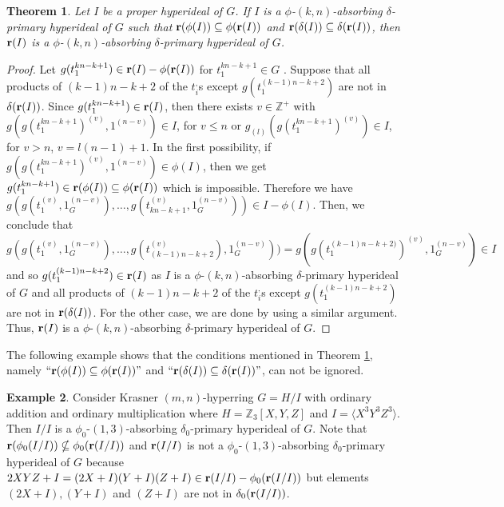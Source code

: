 \documentclass[preprint,review,10pt]{amsart}
\newtheorem{theorem}{Theorem}[section]
\theoremstyle{definition}
\newtheorem{example}[theorem]{Example}
\theoremstyle{remark}
\numberwithin{equation}{section}
\begin{document}
\begin{theorem} \label{1}
Let $I$ be a proper hyperideal of $G$. If $I$ is a $\phi$-$(k,n)$-absorbing $\delta$-primary hyperideal of $G$ such that  ${\bf r}(\phi(I)) \subseteq \phi({\bf r}(I))$ and  ${\bf r}(\delta(I)) \subseteq \delta({\bf r}(I))$, then ${\bf r}(I)$ is a $\phi$-$(k,n)$-absorbing $\delta$-primary hyperideal of $G$.
\end{theorem}
\begin{proof}
Let  $g(t_1^{kn-k+1}) \in {\bf r}(I)-\phi({\bf r}(I))$ for $t_1^{kn-k+1} \in G$ . Suppose that  all products of $(k-1)n-k+2$ of the $t_i^,$s except $g(t_1^{(k-1)n-k+2})$ are not in $\delta({\bf r}(I))$. Since $g(t_1^{kn-k+1}) \in {\bf r}(I)$, then there exists $v \in \mathbb{Z}^+$ with $g(g(t_1^{kn-k+1})^{(v)},1^{(n-v)}) \in I$, for $v \leq n$ or $g_{(l)}(g(t_1^{kn-k+1})^{(v)}) \in I$, for $v>n$, $v=l(n-1)+1$. In the first possibility, if $g(g(t_1^{kn-k+1})^{(v)},1^{(n-v)}) \in \phi(I)$, then we get $g(t_1^{kn-k+1}) \in {\bf r}(\phi(I)) \subseteq \phi({\bf r}(I))$ which is impossible. Therefore we have $g(g(t_1^{(v)},1_G^{(n-v)}),\ldots,g(t_{kn-k+1}^{(v)},1_G^{(n-v)})) \in I - \phi(I)$.   Then, we conclude that  $g(g(t_1^{(v)},1_G^{(n-v)}),\ldots,g(t_{(k-1)n-k+2}^{(v)}),1_G^{(n-v)}))=g(g(t_1^{(k-1)n-k+2)})^{(v)},1_G^{(n-v)}) \in I$ and so $g(t_1^{(k-1)n-k+2}) \in {\bf r}(I)$ as  $I$ is a $\phi$-$(k,n)$-absorbing $\delta$-primary hyperideal of $G$ and all products of $(k-1)n-k+2$ of the $t_i^,$s except $g(t_1^{(k-1)n-k+2})$ are not in ${\bf r}(\delta(I))$. For the other case, we are done by using a similar argument. Thus, ${\bf r}(I)$ is a $\phi$-$(k,n)$-absorbing  $\delta$-primary hyperideal of $G$.
\end{proof}
The following example shows that the conditions mentioned in Theorem \ref{1}, namely $``{\bf r}(\phi(I)) \subseteq \phi({\bf r} (I))"$ and $``{\bf r}(\delta(I)) \subseteq \delta({\bf r} (I))"$,   can not be ignored. 
\begin{example}\label{ignor}
Consider Krasner $(m,n)$-hyperring $G=H/I$ with ordinary addition and ordinary multiplication where $H=\mathbb{Z}_3[X,Y,Z]$ and $I=\langle X^3Y^3Z^3\rangle$.
 Then $I/I$ is a $\phi_0$-$(1,3)$-absorbing $\delta_0$-primary hyperideal of $G$. Note that ${\bf r}(\phi_0(I/I)) \nsubseteq \phi_0({\bf r} (I/I))$ and 
${\bf r} (I/I)$ is not a $\phi_0$-$(1,3)$-absorbing $\delta_0$-primary hyperideal of $G$ because $2XYZ+I=(2X+I)(Y+I)(Z+I) \in {\bf r} (I/I) - \phi_0({\bf r} (I/I))$ but  elements $(2X+I), (Y+I)$ and $(Z+I)$ are  not in  $\delta_0({\bf r} (I/I))$.
\end{example}
\end{document}
